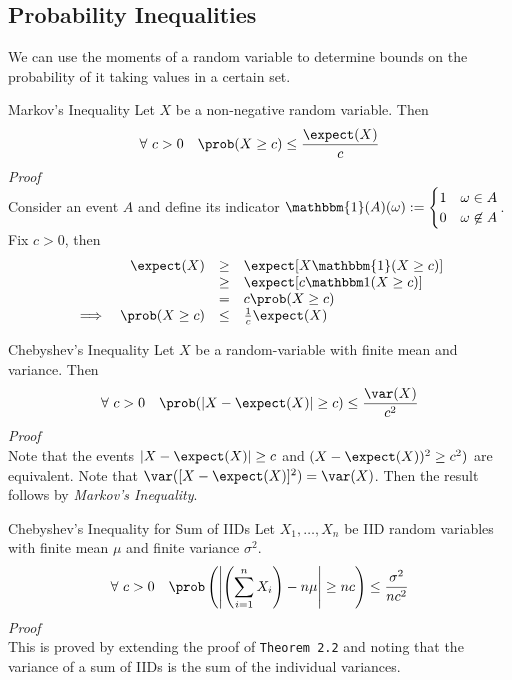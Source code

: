 \documentclass[11pt,a4paper]{article}
\begin{document}
\subsection{Probability Inequalities}

  \begin{remark}{We can use the moments of a random variable to determine bounds on the probability of it taking values in a certain set.}
  \end{remark}

  \begin{theorem}{Markov's Inequality}
    Let $X$ be a non-negative random variable. Then
    \[ \forall\ c>0\quad\prob(X\geq c)\leq\frac{\expect(X)}c \]
    \textit{Proof}\\
    Consider an event $A$ and define its indicator $\mathbbm{1}(A)(\omega):=\begin{cases}1&\omega\in A\\0&\omega\not\in A\end{cases}$. Fix $c>0$, then
    \[\begin{array}{rrcl}
      &\expect(X)&\geq&\expect[X\mathbbm{1}(X\geq c)]\\
      &&\geq&\expect[c\mathbbm1(X\geq c)]\\
      &&=&c\prob(X\geq c)\\
      \implies&\prob(X\geq c)&\leq&\frac1c\expect(X)
    \end{array}\]
  \end{theorem}

  \begin{theorem}{Chebyshev's Inequality}
    Let $X$ be a random-variable with finite mean and variance. Then
    \[ \forall\ c>0\quad\prob(|X-\expect(X)|\geq c)\leq\frac{\var(X)}{c^2}\]
    \textit{Proof}\\
    Note that the events $|X-\expect(X)|\geq c$ and $(X-\expect(X))^2\ge c^2)$ are equivalent. Note that $\var([X-\expect(X)]^2)=\var(X)$. Then the result follows by \textit{Markov's Inequality}.
  \end{theorem}

  \begin{theorem}{Chebyshev's Inequality for Sum of IIDs}
    Let $X_1,\dots,X_n$ be IID random variables with finite mean $\mu$ and finite variance $\sigma^2$.
    \[ \forall\ c>0\quad\prob\left(\left|\left(\sum_{i=1}^nX_i\right)-n\mu\right|\geq nc\right)\leq\frac{\sigma^2}{nc^2} \]
    \textit{Proof}\\
    This is proved by extending the proof of \texttt{Theorem 2.2} and noting that the variance of a sum of IIDs is the sum of the individual variances.
  \end{theorem}
\end{document}
